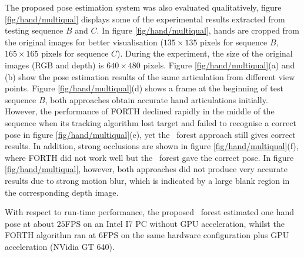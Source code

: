 The proposed pose estimation system was also evaluated qualitatively, figure \ref{fig/hand/multiqual} displays some of the experimental results extracted from testing sequence $B$ and $C$.
In figure \ref{fig/hand/multiqual}, hands are cropped from the original images for better visualisation ($135\times135$ pixels for sequence $B$, $165\times165$ pixels for sequence $C$). During the experiment, the size of the original images (RGB and depth) is $640\times480$ pixels.
Figure \ref{fig/hand/multiqual}(a) and (b) show the pose estimation results of the same articulation from different view points.  
Figure \ref{fig/hand/multiqual}(d) shows a frame at the beginning of test sequence $B$, both approaches obtain accurate hand articulations initially. However, the performance of FORTH declined rapidly in the middle of the sequence when its tracking algorithm lost target and failed to recognise a correct pose in figure \ref{fig/hand/multiqual}(e), yet the \STR\ forest approach still gives correct results. In addition, strong occlusions are shown in figure \ref{fig/hand/multiqual}(f), where FORTH did not work well but the \STR\ forest gave the correct pose. In figure \ref{fig/hand/multiqual}, however, both approaches did not produce very accurate results due to strong motion blur, which is indicated by a large blank region in the corresponding depth image.   

With respect to run-time performance, the proposed \STR\ forest estimated one hand pose at about $25$FPS on an Intel I7 PC without GPU acceleration, whilst the FORTH algorithm ran at $6$FPS on the same hardware configuration plus GPU acceleration (NVidia GT 640). 


 

